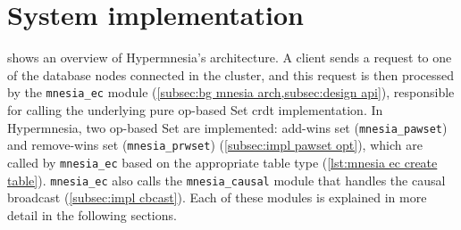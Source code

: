 
\section{System implementation} \label{sec:impl}


 shows an overview of Hypermnesia's architecture. 
A client sends a request to one of the database nodes connected in the cluster, 
and this request is then processed by the \verb|mnesia_ec| 
module (\cref{subsec:bg mnesia arch,subsec:design api}), responsible
for calling the underlying pure op-based Set \acrshort{crdt} implementation.
In Hypermnesia, two op-based Set 
are implemented: add-wins set (\verb|mnesia_pawset|) and remove-wins set (\verb|mnesia_prwset|)
(\cref{subsec:impl pawset opt}), which are called by \verb|mnesia_ec| based on the 
appropriate
table type (\cref{lst:mnesia ec create table}). 
\verb|mnesia_ec| also calls the \verb|mnesia_causal| module that handles the causal 
broadcast (\cref{subsec:impl cbcast}). Each of these modules is explained in more
detail in the following sections.


